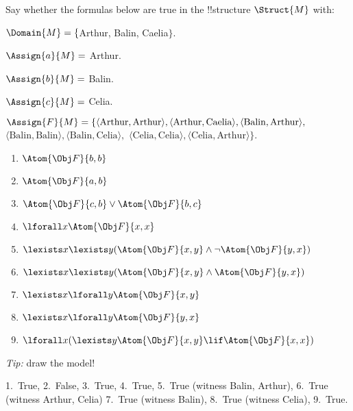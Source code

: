 \documentclass[../../../../include/open-logic-section]{subfiles}
\begin{document}


\begin{prob}
Say whether the formulas below are true
in the !!{structure} $\Struct{M}$ with:

$\Domain{M}=\{$Arthur, Balin, Caelia$\}$.

$\Assign{a}{M} =$ Arthur. 

$\Assign{b}{M} =$ Balin.

$\Assign{c}{M} =$ Celia.

$\Assign{\mathord{F}}{M} =\{\langle\mbox{Arthur},\mbox{Arthur}\rangle,\langle\mbox{Arthur},\mbox{Caelia}\rangle,\langle\mbox{Balin},\mbox{Arthur}\rangle,$
$\langle\mbox{Balin},\mbox{Balin}\rangle,\langle\mbox{Balin},\mbox{Celia}\rangle,$
$\langle\mbox{Celia},\mbox{Celia}\rangle,\langle\mbox{Celia},\mbox{Arthur}\rangle\}$.
\begin{enumerate}
\item $\Atom{\Obj F}{b,b}$
\item $\Atom{\Obj F}{a,b}$
\item $\Atom{\Obj F}{c,b}\lor \Atom{\Obj F}{b,c}$
\item $\lforall x\Atom{\Obj F}{x,x}$
\item $\lexists x\lexists y(\Atom{\Obj F}{x,y}\land\lnot \Atom{\Obj F}{y,x})$
\item $\lexists x\lexists y(\Atom{\Obj F}{x,y}\land \Atom{\Obj F}{y,x})$
\item $\lexists x\lforall y\Atom{\Obj F}{x,y}$
\item $\lexists x\lforall y\Atom{\Obj F}{y,x}$
\item $\lforall x(\lexists y\Atom{\Obj F}{x,y}\lif \Atom{\Obj F}{x,x})$
\end{enumerate}
\emph{Tip: }draw the model!
\begin{ans}
1.~True, 2.~False, 3.~True, 4.~True, 5.~True (witness Balin, Arthur), 
6.~True (witness Arthur, Celia) 7.~True (witness Balin), 
8.~True (witness Celia), 9.~True.
\end{ans}
\end{prob}
\end{document}
